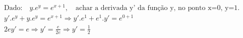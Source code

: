 \begin{ex}
\begin{align}
&\text{Dado:}\quad y.e^{y}=e^{x+1},\quad \text{achar a derivada y' da função y, no ponto x=0, y=1.} \nonumber\\
&y'.e^{y}+y.e^{y}=e^{x+1} \Rightarrow y'.e^1+e^1.y'=e^{0+1}\nonumber\\
&2ey'=e \Rightarrow y'=\frac{e}{2e} \Rightarrow y'=\frac{1}{2}\nonumber
\end{align}
\end{ex}